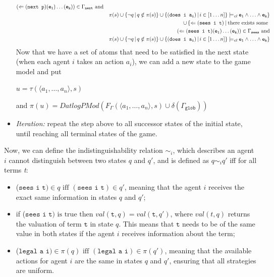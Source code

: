 \documentclass{article}
\theoremstyle{theorem}
\theoremstyle{lemma}
\theoremstyle{definition}
\theoremstyle{remark}
\begin{document}
\begin{itemize}
\begin{eqnarray*}
      (\Leftarrow(\texttt{next
        p})(\texttt{e\textsubscript{1}})\ldots(\texttt{e\textsubscript{k}}))
      \in \Gamma_\texttt{next} \text{ and}\\ & & \pi(s) \cup \{ \neg
      q\,|\,q\notin \pi(s) \} \cup \{(\texttt{does i
        a\textsubscript{i}})\,|\,i \in [1\ldots n]
      \}\models_\textit{cl} \texttt{e\textsubscript{1}} \wedge \ldots
      \wedge \texttt{e\textsubscript{k}} \}\\ & & \cup \,\{ \Leftarrow
      (\texttt{sees i t})\:|\: \text{there exists some }\\ & &
      (\Leftarrow(\texttt{sees i t})
      (\texttt{e\textsubscript{1}})\ldots(\texttt{e\textsubscript{k}}))
      \in \Gamma_\texttt{sees} \text{ and}\\ & & \pi(s) \cup \{ \neg
      q\,|\,q\notin \pi(s) \} \cup \{(\texttt{does i
        a\textsubscript{i}})\,|\,i \in [1\ldots n]
      \}\models_\textit{cl} \texttt{e\textsubscript{1}} \wedge \ldots
      \wedge \texttt{e\textsubscript{k}} \}
    \end{eqnarray*}
    Now that we have a set of atoms that need to be satisfied in the next state (when each agent $i$ takes an action $a_i$), we can add a new state to the game model and put
    \begin{center}
        \par $u = \tau(\langle{a_1, \ldots, a_n}\rangle, s)$ \par and
        $\pi(u) = \textit{DatlogPMod}(F_\Gamma(\langle{a_1, \ldots,
          a_n}\rangle, s)\cup \delta(\Gamma_\texttt{glob}))$
    \end{center}
    \item \textit{Iteration:} repeat the step above to all successor
      states of the initial state, until reaching all terminal states
      of the game.
\end{itemize}
\par Now, we can define the indistinguishability relation $\sim_{i}$,
which describes an agent $i$ cannot distinguish between two states $q$
and $q'$, and is defined as $q \sim_{i} q'$ iff for all terms
\textit{t}:
\begin{itemize}
    \item ($\texttt{sees i t}) \in q \text{ iff } (\texttt{sees i t}) \in q'$, meaning that the agent $i$ receives the exact same information in states $q$ and $q'$;
    \item if ($\texttt{sees i t})\text{ is true then } val(\texttt{t}, q) = val(\texttt{t}, q')$, where $val(t,q)$ returns the valuation of term $\texttt{t}$ in state $q$. This means that $\texttt{t}$ needs to be of the same value in both states if the agent $i$ receives information about the term;
    \item ($\texttt{legal a i}) \in \pi(q) \text{ iff } (\texttt{legal a i}) \in \pi(q')$, meaning that the available actions for agent $i$ are the same in states $q$ and $q'$, ensuring that all strategies are uniform.
\end{itemize}
\end{document}
